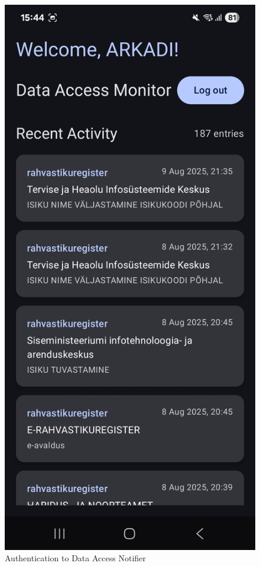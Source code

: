 \begin{figure}[H]
\begin{minipage}{0.32\textwidth}
\end{minipage}%
\hfill
\begin{minipage}{0.32\textwidth}
    \centering
    \includegraphics[width=\textwidth]{english/figures/Screenshot_20250810_154411_Data Access Notifier.jpg}
\end{minipage}
\caption{Authentication to Data Access Notifier}
\label{fig:app-usage}
\end{figure} 

